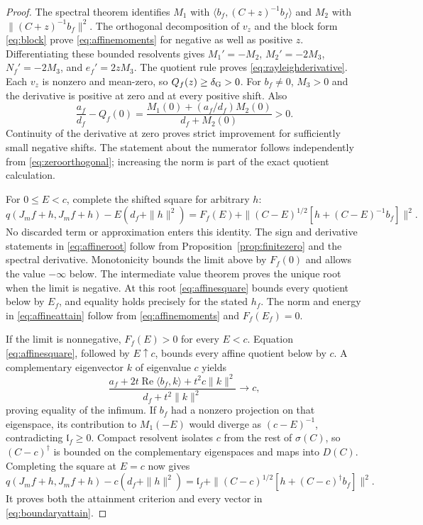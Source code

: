 \documentclass[11pt]{article}
\newcommand{\Rea}{\operatorname{Re}}
\begin{document}
\begin{proof}
The spectral theorem identifies $M_1$ with
$\langle b_f,(C+z)^{-1}b_f\rangle$ and $M_2$ with
$\|(C+z)^{-1}b_f\|^2$. The orthogonal decomposition of $v_z$ and
the block form \eqref{eq:block} prove \eqref{eq:affinemoments}
for negative as well as positive $z$. Differentiating these bounded
resolvents gives $M_1'=-M_2$, $M_2'=-2M_3$,
$N_f'=-2M_3$, and $e_f'=2zM_3$. The quotient rule proves
\eqref{eq:rayleighderivative}. Each $v_z$ is nonzero and mean-zero,
so $Q_f(z)\geq\delta_{\rm G}>0$.
For $b_f\ne0$, $M_3>0$ and the derivative is positive at zero
and at every positive shift. Also
\[
 \frac{a_f}{d_f}-Q_f(0)
 =\frac{M_1(0)+(a_f/d_f)M_2(0)}{d_f+M_2(0)}>0 .
\]
Continuity of the derivative at zero proves strict improvement for
sufficiently small negative shifts. The statement about the numerator
follows independently from \eqref{eq:zeroorthogonal}; increasing the
norm is part of the exact quotient calculation.

For $0\leq E<c$, complete the shifted square for arbitrary $h$:
\begin{equation}\label{eq:affinesquare}
 q(J_mf+h,J_mf+h)-E(d_f+\|h\|^2)
 =F_f(E)+\|(C-E)^{1/2}[h+(C-E)^{-1}b_f]\|^2.
\end{equation}
No discarded term or approximation enters this identity.
The sign and derivative statements in \eqref{eq:affineroot} follow
from Proposition~\ref{prop:finitezero} and the spectral derivative.
Monotonicity bounds the limit above by $F_f(0)$ and allows the value
$-\infty$ below. The intermediate value theorem proves the unique
root when the limit is negative. At this root
\eqref{eq:affinesquare} bounds every quotient below by $E_f$,
and equality holds precisely for the stated $h_f$. The norm and
energy in \eqref{eq:affineattain} follow from
\eqref{eq:affinemoments} and $F_f(E_f)=0$.

If the limit is nonnegative, $F_f(E)>0$ for every $E<c$.
Equation \eqref{eq:affinesquare}, followed by $E\uparrow c$,
bounds every affine quotient below by $c$. A complementary
eigenvector $k$ of eigenvalue $c$ yields
\[
 \frac{a_f+2t\Rea\langle b_f,k\rangle+t^2c\|k\|^2}
      {d_f+t^2\|k\|^2}\longrightarrow c,
\]
proving equality of the infimum. If $b_f$ had a nonzero projection
on that eigenspace, its contribution to $M_1(-E)$ would diverge as
$(c-E)^{-1}$, contradicting $\mathfrak l_f\geq0$.
Compact resolvent isolates $c$ from the rest of $\sigma(C)$, so
$(C-c)^\dagger$ is bounded on the complementary eigenspaces and
maps into $D(C)$. Completing the square at $E=c$ now gives
\[
 q(J_mf+h,J_mf+h)-c(d_f+\|h\|^2)
 =\mathfrak l_f+
 \|(C-c)^{1/2}[h+(C-c)^\dagger b_f]\|^2 .
\]
It proves both the attainment criterion and every vector in
\eqref{eq:boundaryattain}.
\end{proof}
\end{document}
